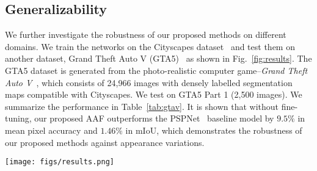 \subsection{Generalizability}
We further investigate the robustness of our proposed methods on different domains. We train the networks on the Cityscapes dataset~\cite{Cordts2016Cityscapes} and test them on another dataset, Grand Theft Auto V (GTA5)~\cite{Richter_2016_ECCV} as shown in Fig.~\ref{fig:results}. The GTA5 dataset is generated from the photo-realistic computer game--\textit{Grand Theft Auto V}~\cite{Richter_2016_ECCV}, which consists of 24,966 images with densely labelled segmentation maps compatible with Cityscapes. We test on GTA5 Part 1 (2,500 images). We summarize the performance in Table~\ref{tab:gtav}. It is shown that without fine-tuning, our proposed AAF outperforms the PSPNet~\cite{zhao2016pyramid} baseline model by $9.5\%$ in mean pixel accuracy and $1.46\%$ in mIoU, which demonstrates the robustness of our proposed methods against appearance variations. 



\begin{table*}[t]
  \centering
    \vspace{0.5pt}
    \caption{Per-class results on GTA5 Part 1.}
    \label{tab:gtav}
\end{table*}

\begin{figure*}[b]
    \centering
    \texttt{[image: figs/results.png]}
    \caption{Visual quality comparisons on the VOC 2012~\cite{everingham2010pascal} validation set (the first four rows), Cityscapes~\cite{Cordts2016Cityscapes} validation set (the middle two rows) and GTA5~\cite{Richter_2016_ECCV} part 1 (the bottom row): (a) image, (b) ground truth, (c) PSPNet~\cite{zhao2016pyramid}, (d) affinity fields, and (e) adaptive affinity fields (AAF).}
    \label{fig:results}
\end{figure*}